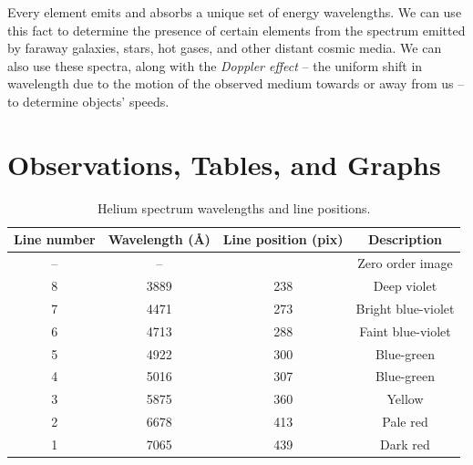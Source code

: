 \documentclass[11pt]{article}
\begin{document}
Every element emits and absorbs a unique set of energy wavelengths.
We can use this fact to determine the presence of certain elements from the spectrum emitted by faraway galaxies, stars, hot gases, and other distant cosmic media.
We can also use these spectra, along with the \emph{Doppler effect} -- the uniform shift in wavelength due to the motion of the observed medium towards or away from us -- to determine objects' speeds.


\section{Observations, Tables, and Graphs}

\begin{table}[h]
\caption{Helium spectrum wavelengths and line positions.}
\renewcommand{\arraystretch}{1.5}
\begin{tabular}{| c | c | c | c |}
	\hline
	Line number & Wavelength (\r{A}) & Line position (pix) & Description\\ \hline
	-- & -- && Zero order image\\ \hline
	8 & 3889 & 238 & Deep violet\\ \hline
	7 & 4471 & 273 & Bright blue-violet\\ \hline
	6 & 4713 & 288 & Faint blue-violet\\ \hline
	5 & 4922 & 300 & Blue-green\\ \hline
	4 & 5016 & 307 & Blue-green\\ \hline
	3 & 5875 & 360 & Yellow\\ \hline
	2 & 6678 & 413 & Pale red\\ \hline
	1 & 7065 & 439 & Dark red\\
	\hline
\end{tabular}
\label{table:helium_spectrum}
\end{table}
\end{document}

